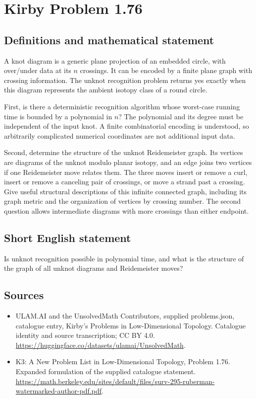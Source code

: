 \documentclass[11pt,a4paper]{article}
\begin{document}
\section*{Kirby Problem 1.76}\label{statement}

\subsection{Definitions and mathematical statement}
A knot diagram is a generic plane projection of an embedded circle, with
over/under data at its $n$ crossings. It can be encoded by a finite plane graph
with crossing information. The unknot recognition problem returns yes exactly
when this diagram represents the ambient isotopy class of a round circle.

First, is there a deterministic recognition algorithm whose worst-case running
time is bounded by a polynomial in $n$? The polynomial and its degree must be
independent of the input knot. A finite combinatorial encoding is understood,
so arbitrarily complicated numerical coordinates are not additional input data.

Second, determine the structure of the unknot Reidemeister graph. Its vertices
are diagrams of the unknot modulo planar isotopy, and an edge joins two vertices
if one Reidemeister move relates them. The three moves insert or remove a curl,
insert or remove a canceling pair of crossings, or move a strand past a crossing.
Give useful structural descriptions of this infinite connected graph, including
its graph metric and the organization of vertices by crossing number.
The second question allows intermediate diagrams with more crossings than
either endpoint.
\subsection{Short English statement}
Is unknot recognition possible in polynomial time, and what is the structure of the graph of all unknot diagrams and Reidemeister moves?
\subsection{Sources}
\begin{itemize}
\item[S1] ULAM.AI and the UnsolvedMath Contributors, supplied problems.json, catalogue entry, Kirby's Problems in Low-Dimensional Topology. Catalogue identity and source transcription; CC BY 4.0.
\url{https://huggingface.co/datasets/ulamai/UnsolvedMath}.
\item[S2] K3: A New Problem List in Low-Dimensional Topology, Problem 1.76. Expanded formulation of the supplied catalogue statement.
\url{https://math.berkeley.edu/sites/default/files/surv-295-ruberman-watermarked-author-pdf.pdf}.
\end{itemize}
\end{document}
